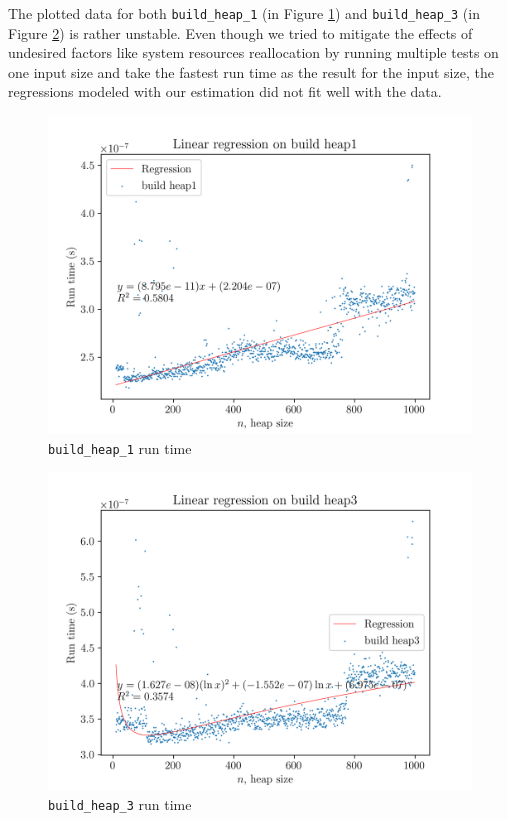\documentclass[titlepage, 12pt]{article}
\begin{document}
The plotted data for both \texttt{build\_heap\_1} (in Figure \ref{fig:build1})
and \texttt{build\_heap\_3} (in Figure \ref{fig:build3}) is rather unstable.
Even though we tried to mitigate the effects of undesired factors like system
resources reallocation by running multiple tests on one input size and take the
fastest run time as the result for the input size, the regressions modeled with
our estimation did not fit well with the data.
\begin{figure}[h]
  \centering
  \includegraphics[width=\linewidth]{build1} 
  \caption{\texttt{build\_heap\_1} run time}
  \label{fig:build1}
\end{figure}
\begin{figure}[h]
  \centering
  \includegraphics[width=\linewidth]{build3} 
  \caption{\texttt{build\_heap\_3} run time}
  \label{fig:build3}
\end{figure}
\end{document}
